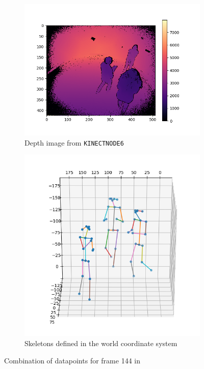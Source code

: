 \begin{figure}
  \centering
  \begin{subfigure}{.6\textwidth}
    \centering
    \includegraphics[width=\linewidth]{img/depth_image}
    \caption{Depth image from \texttt{KINECTNODE6}}
    \label{fig:depth_image}
  \end{subfigure}%
  \begin{subfigure}{.4\textwidth}
    \centering
    \includegraphics[width=\linewidth]{img/dataset_skeletons}
    \caption{Skeletons defined in the world coordinate system}
    \label{fig:dataset_skeletons}
  \end{subfigure}%
  \caption{Combination of datapoints for frame 144 in \cite{Joo_2015_ICCV}}
  \label{fig:skeleton_depth_duo}
\end{figure}


